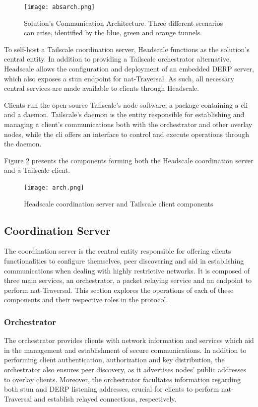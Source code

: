 \documentclass[11pt,twoside,a4paper]{report}
\begin{document}
\begin{figure}[h]
\centering
\texttt{[image: absarch.png]}
\caption{Solution's Communication Architecture. Three different scenarios can arise, identified by the blue, green and orange tunnels.}
\label{fig:absarch}
\end{figure}

To self-host a Tailscale coordination server, Headscale functions as the solution's central entity. In addition to providing a Tailscale orchestrator alternative, Headscale allows the configuration and deployment of an embedded \ac{DERP} server, which also exposes a \ac{stun} endpoint for \ac{nat}-Traversal. As such, all necessary central services are made available to clients through Headscale.

Clients run the open-source Tailscale's node software, a package containing a \ac{cli} and a daemon. Tailscale's daemon is the entity responsible for establishing and managing a client's communications both with the orchestrator and other overlay nodes, while the \ac{cli} offers an interface to control and execute operations through the daemon.

Figure \ref{fig:arch} presents the components forming both the Headscale coordination server and a Tailscale client.

\begin{figure}[h]
\centering
\texttt{[image: arch.png]}
\caption{Headscale coordination server and Tailscale client components}
\label{fig:arch}
\end{figure}

\subsection{Coordination Server}

The coordination server is the central entity responsible for offering clients functionalities to configure themselves, peer discovering and aid in establishing communications when dealing with highly restrictive networks. It is composed of three main services, an orchestrator, a packet relaying service and an endpoint to perform \ac{nat}-Traversal. This section explores the operations of each of these components and their respective roles in the protocol.

\subsubsection{Orchestrator}

The orchestrator provides clients with network information and services which aid in the management and establishment of secure communications. In addition to performing client authentication, authorization and key distribution, the orchestrator also ensures peer discovery, as it advertises nodes' public addresses to overlay clients. Moreover, the orchestrator facultates information regarding both \ac{stun} and \ac{DERP} listening addresses, crucial for clients to perform \ac{nat}-Traversal and establish relayed connections, respectively.
\end{document}
